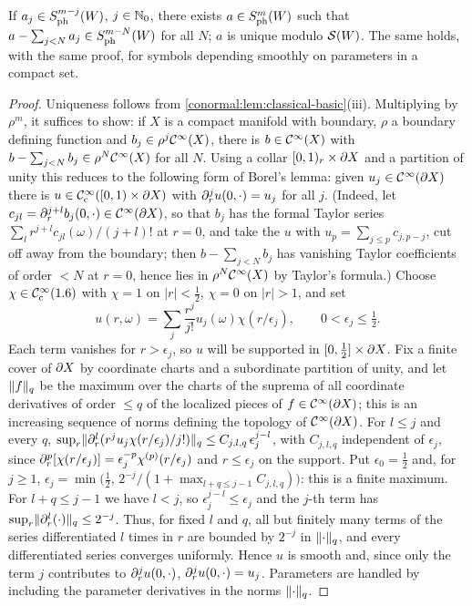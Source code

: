 \begin{proposition}\label{conormal:prop:asymp}
  If $a_j\in S^{m-j}_{\mathrm{ph}}(W)$, $j\in\mathbb{N}_0$, there exists $a\in S^{m}_{\mathrm{ph}}(W)$ such
  that $a-\sum_{j<N}a_j\in S^{m-N}_{\mathrm{ph}}(W)$ for all $N$; $a$ is unique modulo
  $\mathcal{S}(W)$.  The same holds, with the same proof, for symbols depending
  smoothly on parameters in a compact set.
\end{proposition}
\begin{proof}
  Uniqueness follows from \cref{conormal:lem:classical-basic}(iii).  Multiplying
  by $\rho^m$, it suffices to show: if $X$ is a compact manifold with boundary,
  $\rho$ a boundary defining function and $b_j\in\rho^j\mathcal{C}^\infty(X)$, there is
  $b\in\mathcal{C}^\infty(X)$ with $b-\sum_{j<N}b_j\in\rho^N\mathcal{C}^\infty(X)$ for all $N$.  Using a
  collar $[0,1)_r\times\partial X$ and a partition of unity this reduces to the
  following form of Borel's lemma: given $u_j\in\mathcal{C}^\infty(\partial X)$ there is
  $u\in\mathcal{C}^\infty_{\mathrm{c}}([0,1)\times\partial X)$ with $\partial_r^ju(0,\cdot)=u_j$ for all $j$.  (Indeed,
  let $c_{jl}=\partial_r^{j+l}b_j(0,\cdot)\in\mathcal{C}^\infty(\partial X)$, so that $b_j$ has the
  formal Taylor series $\sum_lr^{j+l}c_{jl}(\omega)/(j+l)!$ at $r=0$, and
  take the $u$ with $u_p=\sum_{j\le p}c_{j,p-j}$, cut off away from the
  boundary; then $b-\sum_{j<N}b_j$ has vanishing Taylor coefficients of order
  $<N$ at $r=0$, hence lies in $\rho^N\mathcal{C}^\infty(X)$ by Taylor's formula.)  Choose
  $\chi\in\mathcal{C}^\infty_{\mathrm{c}}(1.6)$ with $\chi=1$ on $|r|<\frac12$, $\chi=0$ on $|r|>1$, and set
  \begin{equation*}
    u(r,\omega)=\sum_j \frac{r^j}{j!}u_j(\omega)\chi(r/\epsilon_j),\qquad
    0<\epsilon_j\le\tfrac12.
  \end{equation*}
  Each term vanishes for $r>\epsilon_j$, so $u$ will be supported in
  $[0,\frac12]\times\partial X$. Fix a finite cover of $\partial X$ by coordinate
  charts and a subordinate partition of unity, and let $\lVert f\rVert_q$ be the
  maximum over the charts of the suprema of all coordinate derivatives of
  order $\le q$ of the localized pieces of $f\in\mathcal{C}^\infty(\partial X)$; this is an
  increasing sequence of norms defining the topology of $\mathcal{C}^\infty(\partial X)$. For
  $l\le j$ and every $q$,
  $\sup_r\lVert \partial_r^l(r^ju_j\chi(r/\epsilon_j)/j!)\rVert_q\le C_{j,l,q}\,\epsilon_j^{j-l}$,
  with $C_{j,l,q}$ independent of $\epsilon_j$, since
  $\partial_r^p[\chi(r/\epsilon_j)]=\epsilon_j^{-p}\chi^{(p)}(r/\epsilon_j)$ and
  $r\le\epsilon_j$ on the support.  Put $\epsilon_0=\frac12$ and, for $j\ge1$,
  $\epsilon_j=\min\bigl(\frac12,\,2^{-j}/(1+\max_{l+q\le j-1}C_{j,l,q})\bigr)$:
  this is a finite maximum. For $l+q\le j-1$ we have $l<j$, so
  $\epsilon_j^{j-l}\le\epsilon_j$ and the $j$-th term has
  $\sup_r\lVert \partial_r^l(\cdot)\rVert_q\le2^{-j}$. Thus, for fixed $l$ and $q$, all
  but finitely many terms of the series differentiated $l$ times in $r$ are
  bounded by $2^{-j}$ in $\lVert \cdot\rVert_q$, and every differentiated series
  converges uniformly.  Hence $u$ is smooth and, since only the term $j$
  contributes to $\partial_r^j u(0,\cdot)$, $\partial_r^ju(0,\cdot)=u_j$.  Parameters are
  handled by including the parameter derivatives in the norms $\lVert \cdot\rVert_q$.
\end{proof}

